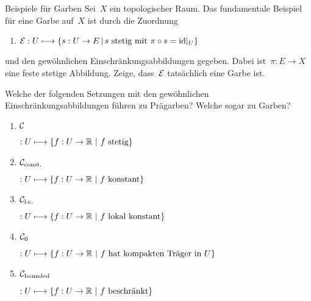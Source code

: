 \documentclass{uebblatt}
\begin{document}

\begin{aufgabe}{Beispiele für Garben}
Sei~$X$ ein topologischer Raum. Das fundamentale Beispiel für eine Garbe
auf~$X$ ist durch die Zuordnung
\begin{enumerate}
\item $\mathcal{E} : U \longmapsto \{ s : U \to E \,|\, \text{$s$ stetig mit $\pi \circ s = \mathrm{id}|_U$} \}$
\end{enumerate}
und den gewöhnlichen Einschränkungsabbildungen gegeben. Dabei ist~$\pi : E \to
X$ eine feste stetige Abbildung. Zeige, dass~$\mathcal{E}$ tatsächlich eine Garbe ist.

Welche der folgenden Setzungen mit den gewöhnlichen Einschränkungsabbildungen
führen zu Prägarben? Welche sogar zu Garben?
\newlength{\sheafname}
\begin{enumerate}
\addtocounter{enumi}{1}
\item \parbox{\sheafname}{$\mathcal{C}$} $: U \longmapsto \{ f : U \to \RR \ |\  \text{$f$ stetig} \}$
\item \parbox{\sheafname}{$\mathcal{C}_\text{const.}$} $ : U \longmapsto \{ f : U \to \RR \ |\  \text{$f$ konstant} \}$
\item \parbox{\sheafname}{$\mathcal{C}_\text{l.c.}$} $ : U \longmapsto \{ f : U \to \RR \ |\  \text{$f$ lokal konstant} \}$
\item \parbox{\sheafname}{$\mathcal{C}_\text{0}$} $ : U \longmapsto \{ f : U \to \mathbb{R} \ |\
\text{$f$ hat kompakten Träger in~$U$} \}$
\item \parbox{\sheafname}{$\mathcal{C}_\text{bounded}$} $ : U \longmapsto \{ f : U \to \RR \ |\  \text{$f$ beschränkt} \}$
\end{enumerate}
\end{aufgabe}
\end{document}
